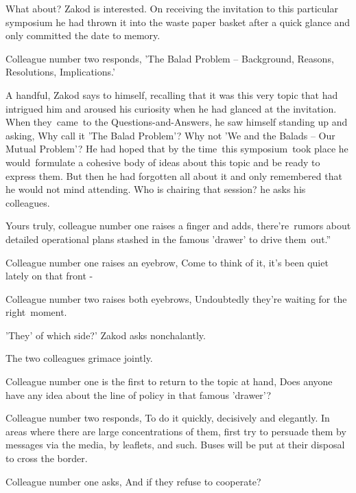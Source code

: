 \documentclass[twoside,11pt]{book}
\begin{document}
{\textquotedbl}What about?{\textquotedbl} Zakod is interested. On receiving the invitation to this particular symposium
he had thrown it into the waste paper basket after a quick glance and only committed the date to memory. 

Colleague number two responds, {\textquotedbl}'The Balad Problem -- Background, Reasons, Resolutions,
Implications.{}'{\textquotedbl} 

A handful, Zakod says to himself, recalling that it was this very topic that had intrigued him and aroused his curiosity
when he had glanced at the invitation. When they{\ }came{\ }to
the Questions-and-Answers{, }he saw himself standing up and asking, {\textquotedbl}Why call it 'The
Balad Problem'? Why not 'We and the Balads -- Our Mutual Problem'?{\textquotedbl} He had hoped that by the time~this
symposium{\ }took place he would~formulate a cohesive body of ideas about this topic and be ready to
express them. But then he had forgotten all about it and only remembered that he would not mind attending.
{\textquotedbl}Who is chairing that session?{\textquotedbl} he asks his colleagues. 

{\textquotedbl}Yours truly,{\textquotedbl} colleague number one raises a finger and adds, {\textquotedbl}there're~rumors
about detailed operational plans stashed in the famous 'drawer{}' to drive them\ out.''

Colleague number one raises an eyebrow, {\textquotedbl}Come to think of it, it's been quiet lately on that front
-{\textquotedbl} 

Colleague number two raises both eyebrows, {\textquotedbl}Undoubtedly they're waiting for the
right~moment.{\textquotedbl} 

{\textquotedbl}'They' of which side?{\textquotedbl}{}' Zakod asks nonchalantly.

The two colleagues grimace jointly. 

Colleague number one is the first to return to the topic at hand, {\textquotedbl}Does anyone have any idea about the
line of policy in that famous {}'drawer{}'?{\textquotedbl} 

Colleague number two responds, {\textquotedbl}To do it quickly, decisively and elegantly. In areas where there are large
concentrations of them, first try to persuade them by messages via the media, by leaflets, and such. Buses will be put
at their disposal to cross the border.{\textquotedbl} 

Colleague number one asks, {\textquotedbl}And if they refuse to cooperate?{\textquotedbl} 
\end{document}
